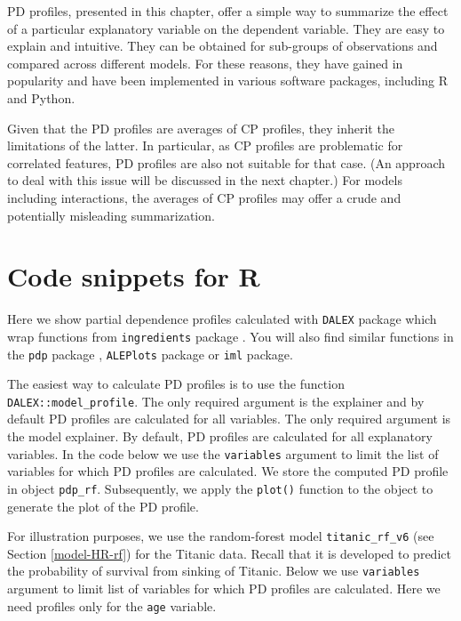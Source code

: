 \documentclass[]{krantz}
\begin{document}
PD profiles, presented in this chapter, offer a simple way to summarize the effect of a particular explanatory variable on the dependent variable. They are easy to explain and intuitive. They can be obtained for sub-groups of observations and compared across different models. For these reasons, they have gained in popularity and have been implemented in various software packages, including R and Python.

Given that the PD profiles are averages of CP profiles, they inherit the limitations of the latter. In particular, as CP profiles are problematic for correlated features, PD profiles are also not suitable for that case. (An approach to deal with this issue will be discussed in the next chapter.) For models including interactions, the averages of CP profiles may offer a crude and potentially misleading summarization.

\hypertarget{PDPR}{%
\section{Code snippets for R}\label{PDPR}}

Here we show partial dependence profiles calculated with \texttt{DALEX} package which wrap functions from \texttt{ingredients} package \citep{ingredientsRPackage}. You will also find similar functions in the \texttt{pdp} package \citep{pdpRPackage}, \texttt{ALEPlots} package \citep{ALEPlotRPackage} or \texttt{iml} \citep{imlRPackage} package.

The easiest way to calculate PD profiles is to use the function \texttt{DALEX::model\_profile}.
The only required argument is the explainer and by default PD profiles are calculated for all variables. The only required argument is the model explainer. By default, PD profiles are calculated for all explanatory variables. In the code below we use the \texttt{variables} argument to limit the list of variables for which PD profiles are calculated. We store the computed PD profile in object \texttt{pdp\_rf}. Subsequently, we apply the \texttt{plot()} function to the object to generate the plot of the PD profile.

For illustration purposes, we use the random-forest model \texttt{titanic\_rf\_v6} (see Section \ref{model-HR-rf}) for the Titanic data. Recall that it is developed to predict the probability of survival from sinking of Titanic.
Below we use \texttt{variables} argument to limit list of variables for which PD profiles are calculated. Here we need profiles only for the \texttt{age} variable.
\end{document}
